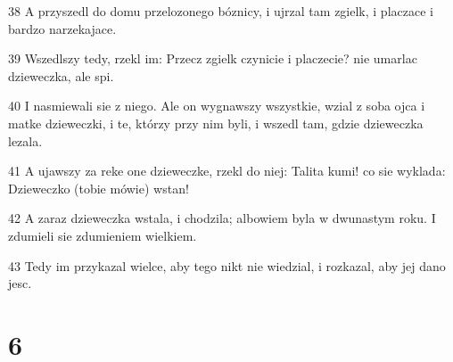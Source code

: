 \par 38 A przyszedl do domu przelozonego bóznicy, i ujrzal tam zgielk, i placzace i bardzo narzekajace.
\par 39 Wszedlszy tedy, rzekl im: Przecz zgielk czynicie i placzecie? nie umarlac dzieweczka, ale spi.
\par 40 I nasmiewali sie z niego. Ale on wygnawszy wszystkie, wzial z soba ojca i matke dzieweczki, i te, którzy przy nim byli, i wszedl tam, gdzie dzieweczka lezala.
\par 41 A ujawszy za reke one dzieweczke, rzekl do niej: Talita kumi! co sie wyklada: Dzieweczko (tobie mówie) wstan!
\par 42 A zaraz dzieweczka wstala, i chodzila; albowiem byla w dwunastym roku. I zdumieli sie zdumieniem wielkiem.
\par 43 Tedy im przykazal wielce, aby tego nikt nie wiedzial, i rozkazal, aby jej dano jesc.

\chapter{6}


